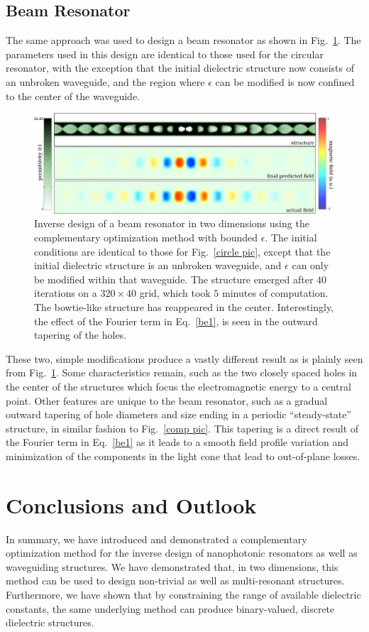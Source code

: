 \subsection{Beam Resonator}
The same approach was used to design a beam resonator as shown in Fig.~\ref{line pic}. The parameters used in this design are identical to those used for the circular resonator, with the exception that the initial dielectric structure now consists of an unbroken waveguide, and the region where $\epsilon$ can be modified is now confined to the center of the waveguide.
\begin{figure}[htbp]\centering
\includegraphics[width=\textwidth]{p1/beam}
\caption{Inverse design of a beam resonator in two dimensions using the complementary optimization method with bounded $\epsilon$. The initial conditions are identical to those for Fig.~\ref{circle pic}, except that the initial dielectric structure is an unbroken waveguide, and $\epsilon$ can only be modified within that waveguide. The structure emerged after $40$ iterations on a $320\times 40$ grid, which took $5$ minutes of computation. The bowtie-like structure has reappeared in the center. Interestingly, the effect of the Fourier term in Eq.~\eqref{be1}, is seen in the outward tapering of the holes.}
\label{line pic}
\end{figure}

These two, simple modifications produce a vastly different result as is plainly seen from Fig.~\ref{line pic}. Some characteristics remain, such as the two closely spaced holes in the center of the structures which focus the electromagnetic energy to a central point. Other features are unique to the beam resonator, such as a gradual outward tapering of hole diameters and size ending in a periodic ``steady-state'' structure, in similar fashion to Fig.~\ref{comp pic}. This tapering is a direct result of the Fourier term in Eq.~\eqref{be1} as it leads to a smooth field profile variation and minimization of the components in the light cone that lead to out-of-plane losses\cite{Vuc05,Aka05}.

\section{Conclusions and Outlook}
In summary, we have introduced and demonstrated a complementary optimization method for the inverse design of nanophotonic resonators as well as waveguiding structures. We have demonstrated that, in two dimensions, this method can be used to design non-trivial as well as multi-resonant structures. Furthermore, we have shown that by constraining the range of available dielectric constants, the same underlying method can produce binary-valued, discrete dielectric structures. 

